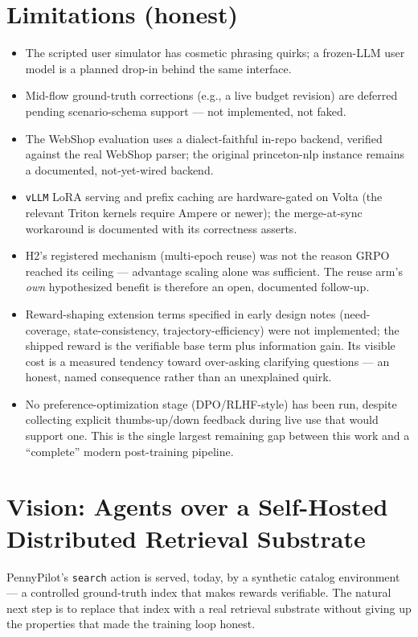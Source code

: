 \documentclass[11pt]{article}
\begin{document}
\section{Limitations (honest)}
\begin{itemize}
\item The scripted user simulator has cosmetic phrasing quirks; a frozen-LLM user
model is a planned drop-in behind the same interface.
\item Mid-flow ground-truth corrections (e.g., a live budget revision) are
deferred pending scenario-schema support --- not implemented, not faked.
\item The WebShop evaluation uses a dialect-faithful in-repo backend, verified
against the real WebShop parser; the original princeton-nlp instance remains a
documented, not-yet-wired backend.
\item \texttt{vLLM} LoRA serving and prefix caching are hardware-gated on Volta
(the relevant Triton kernels require Ampere or newer); the merge-at-sync
workaround is documented with its correctness asserts.
\item H2's registered mechanism (multi-epoch reuse) was not the reason GRPO
reached its ceiling --- advantage scaling alone was sufficient. The reuse arm's
\emph{own} hypothesized benefit is therefore an open, documented follow-up.
\item Reward-shaping extension terms specified in early design notes
(need-coverage, state-consistency, trajectory-efficiency) were not implemented;
the shipped reward is the verifiable base term plus information gain. Its visible
cost is a measured tendency toward over-asking clarifying questions --- an honest,
named consequence rather than an unexplained quirk.
\item No preference-optimization stage (DPO/RLHF-style) has been run, despite
collecting explicit thumbs-up/down feedback during live use that would support
one. This is the single largest remaining gap between this work and a
``complete'' modern post-training pipeline.
\end{itemize}

\section{Vision: Agents over a Self-Hosted Distributed Retrieval Substrate}
PennyPilot's \texttt{search} action is served, today, by a synthetic catalog
environment --- a controlled ground-truth index that makes rewards verifiable.
The natural next step is to replace that index with a real retrieval substrate
without giving up the properties that made the training loop honest.
\end{document}
